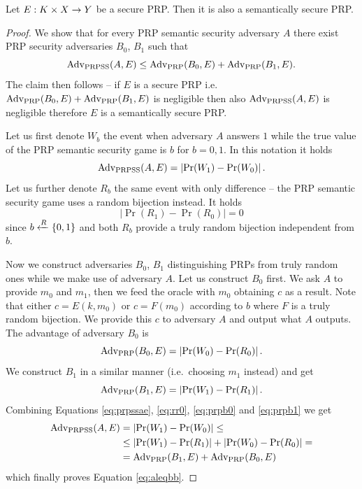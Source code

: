 \begin{thm}
\label{thm:semsecprp}
	Let $E: K\times X\rightarrow Y$ be a secure PRP. Then it is also a semantically secure PRP.
\end{thm}
\begin{proof}
	We show that for every PRP semantic security adversary $A$ there exist PRP security adversaries $B_0$, $B_1$ such that
	\begin{equation}\label{eq:aleqbb}
		\operatorname*{Adv_{PRPSS}}(A,E) \leq \operatorname*{Adv_{PRP}}(B_0,E) + \operatorname*{Adv_{PRP}}(B_1,E) .
	\end{equation}
	The claim then follows -- if $E$ is a secure PRP i.e. $\operatorname*{Adv_{PRP}}(B_0,E) + \operatorname*{Adv_{PRP}}(B_1,E)$ is negligible then also $\operatorname*{Adv_{PRPSS}}(A,E)$ is negligible therefore $E$ is a semantically secure PRP.
	
	Let us first denote $W_b$ the event when adversary $A$ answers $1$ while the true value of the PRP semantic security game is $b$ for $b=0,1$. In this notation it holds
	\begin{equation}\label{eq:prpssae}
		\operatorname*{Adv_{PRPSS}}(A,E) = \left| \Pr(W_1) - \Pr(W_0) \right| .
	\end{equation}
	Let us further denote $R_b$ the same event with only difference -- the PRP semantic security game uses a random bijection instead. It holds
	\begin{equation}\label{eq:rr0}
		\left| \Pr(R_1) - \Pr(R_0) \right| = 0
	\end{equation}
	since $b\xleftarrow{R}\{0,1\}$ and both $R_b$ provide a truly random bijection independent from $b$.
	
	Now we construct adversaries $B_0$, $B_1$ distinguishing PRPs from truly random ones while we make use of adversary $A$. Let us construct $B_0$ first. We ask $A$ to provide $m_0$ and $m_1$, then we feed the oracle with $m_0$ obtaining $c$ as a result. Note that either $c=E(k,m_0)$ or $c=F(m_0)$ according to $b$ where $F$ is a truly random bijection. We provide this $c$ to adversary $A$ and output what $A$ outputs. The advantage of adversary $B_0$ is
	\begin{equation}\label{eq:prpb0}
		\operatorname*{Adv_{PRP}}(B_0,E) = \left| \Pr(W_0) - \Pr(R_0) \right| .
	\end{equation}
	We construct $B_1$ in a similar manner (i.e.\ choosing $m_1$ instead) and get
	\begin{equation}\label{eq:prpb1}
		\operatorname*{Adv_{PRP}}(B_1,E) = \left| \Pr(W_1) - \Pr(R_1) \right| .
	\end{equation}
	Combining Equations \ref{eq:prpssae}, \ref{eq:rr0}, \ref{eq:prpb0} and \ref{eq:prpb1} we get
	\begin{align*}
		\operatorname*{Adv_{PRPSS}}(A,E) &= \left| \Pr(W_1) - \Pr(W_0) \right| \leq \\
		&\leq \left| \Pr(W_1) - \Pr(R_1) \right| + \left| \Pr(W_0) - \Pr(R_0) \right| = \\
		&= \operatorname*{Adv_{PRP}}(B_1,E) + \operatorname*{Adv_{PRP}}(B_0,E)
	\end{align*}
	which finally proves Equation \ref{eq:aleqbb}.
\end{proof}

